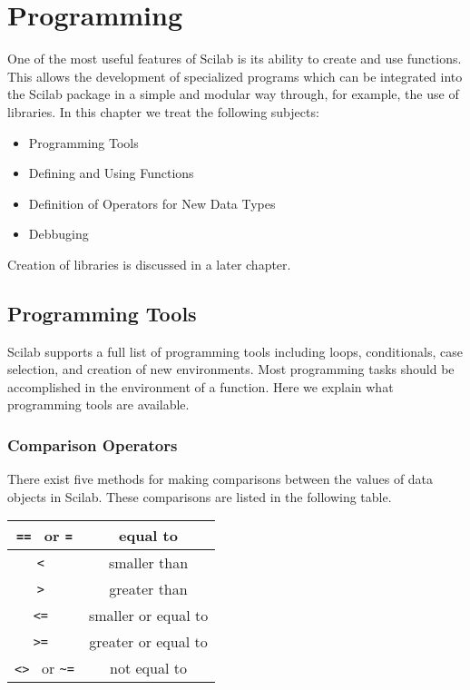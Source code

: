 \chapter{Programming}
\label{ch4}

	One of the most useful features of Scilab is its ability
to create and use functions.  This allows the development of specialized
programs which can be integrated into the Scilab package in a simple and
modular way through, for example, the use of libraries.  In this chapter we 
treat the following subjects:
\begin{itemize}
	\item Programming Tools
	\item Defining and Using Functions
        \item Definition of Operators for New Data Types
	\item{Debbuging}
\end{itemize}	
Creation of libraries is discussed in a later chapter.

\section{Programming Tools}

	Scilab supports a full list of programming tools
including loops, conditionals, case selection,
and creation of new environments.  Most programming tasks
should be accomplished in the environment of a function.
Here we explain what programming tools are available.

\subsection{Comparison Operators}
There exist five methods for making comparisons between the
values of data objects in Scilab. These comparisons are listed
in the following table.

\begin{center}
\begin{tabular}{|c|c|}
\hline
{\tt == } or {\tt =} & equal to \\ \hline
{\tt < } & smaller than \\ \hline
{\tt > } &  greater than \\ \hline
{\tt <= } & smaller or equal to \\ \hline
{\tt >= } & greater or equal to \\ \hline
{\tt <> } or {\verb!~=!} & not equal to \\ \hline
\end{tabular}
\end{center}

